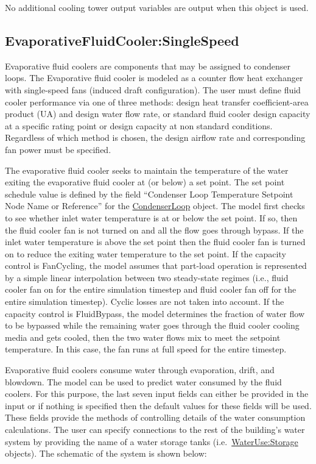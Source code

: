 No additional cooling tower output variables are output when this object is used.

\subsection{EvaporativeFluidCooler:SingleSpeed}\label{evaporativefluidcoolersinglespeed}

Evaporative fluid coolers are components that may be assigned to condenser loops. The Evaporative fluid cooler is modeled as a counter flow heat exchanger with single-speed fans (induced draft configuration). The user must define fluid cooler performance via one of three methods: design heat transfer coefficient-area product (UA) and design water flow rate, or standard fluid cooler design capacity at a specific rating point or design capacity at non standard conditions. Regardless of which method is chosen, the design airflow rate and corresponding fan power must be specified.

The evaporative fluid cooler seeks to maintain the temperature of the water exiting the evaporative fluid cooler at (or below) a set point. The set point schedule value is defined by the field ``Condenser Loop Temperature Setpoint Node Name or Reference'' for the \hyperref[condenserloop]{CondenserLoop} object. The model first checks to see whether inlet water temperature is at or below the set point. If so, then the fluid cooler fan is not turned on and all the flow goes through bypass. If the inlet water temperature is above the set point then the fluid cooler fan is turned on to reduce the exiting water temperature to the set point. If the capacity control is FanCycling, the model assumes that part-load operation is represented by a simple linear interpolation between two steady-state regimes (i.e., fluid cooler fan on for the entire simulation timestep and fluid cooler fan off for the entire simulation timestep). Cyclic losses are not taken into account. If the capacity control is FluidBypass, the model determines the fraction of water flow to be bypassed while the remaining water goes through the fluid cooler cooling media and gets cooled, then the two water flows mix to meet the setpoint temperature. In this case, the fan runs at full speed for the entire timestep.

Evaporative fluid coolers consume water through evaporation, drift, and blowdown. The model can be used to predict water consumed by the fluid coolers. For this purpose, the last seven input fields can either be provided in the input or if nothing is specified then the default values for these fields will be used. These fields provide the methods of controlling details of the water consumption calculations. The user can specify connections to the rest of the building's water system by providing the name of a water storage tanks (i.e.~\hyperref[waterusestorage]{WaterUse:Storage} objects). The schematic of the system is shown below:

